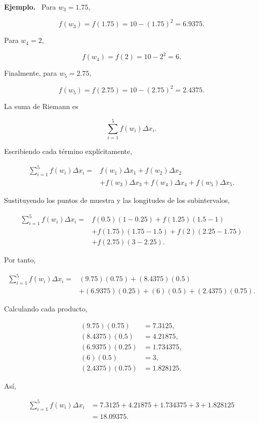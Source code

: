 \documentclass[12pt]{article}
\newenvironment{Ejem}
{\par\medskip\noindent\textbf{Ejemplo.}\ }
{\par\medskip}
\begin{document}
\begin{Ejem}
Para $w_3=1.75$,

\[
f(w_3)
=
f(1.75)
=
10-(1.75)^2
=
6.9375.
\]

Para $w_4=2$,

\[
f(w_4)
=
f(2)
=
10-2^2
=
6.
\]

Finalmente, para $w_5=2.75$,

\[
f(w_5)
=
f(2.75)
=
10-(2.75)^2
=
2.4375.
\]

La suma de Riemann es

\[
\sum_{i=1}^{5}f(w_i)\Delta x_i.
\]

Escribiendo cada término explícitamente,

\[
\begin{aligned}
\sum_{i=1}^{5}f(w_i)\Delta x_i
={}&
f(w_1)\Delta x_1
+
f(w_2)\Delta x_2\\
&+
f(w_3)\Delta x_3
+
f(w_4)\Delta x_4
+
f(w_5)\Delta x_5.
\end{aligned}
\]

Sustituyendo los puntos de muestra y las longitudes de los
subintervalos,

\[
\begin{aligned}
\sum_{i=1}^{5}f(w_i)\Delta x_i
={}&
f(0.5)(1-0.25)
+
f(1.25)(1.5-1)\\
&+
f(1.75)(1.75-1.5)
+
f(2)(2.25-1.75)\\
&+
f(2.75)(3-2.25).
\end{aligned}
\]

Por tanto,

\[
\begin{aligned}
\sum_{i=1}^{5}f(w_i)\Delta x_i
={}&
(9.75)(0.75)
+
(8.4375)(0.5)\\
&+
(6.9375)(0.25)
+
(6)(0.5)
+
(2.4375)(0.75).
\end{aligned}
\]

Calculando cada producto,

\[
\begin{aligned}
(9.75)(0.75)&=7.3125,\\
(8.4375)(0.5)&=4.21875,\\
(6.9375)(0.25)&=1.734375,\\
(6)(0.5)&=3,\\
(2.4375)(0.75)&=1.828125.
\end{aligned}
\]

Así,

\[
\begin{aligned}
\sum_{i=1}^{5}f(w_i)\Delta x_i
&=
7.3125
+4.21875
+1.734375
+3
+1.828125\\
&=
\boxed{18.09375}.
\end{aligned}
\]


\end{Ejem}
\end{document}
